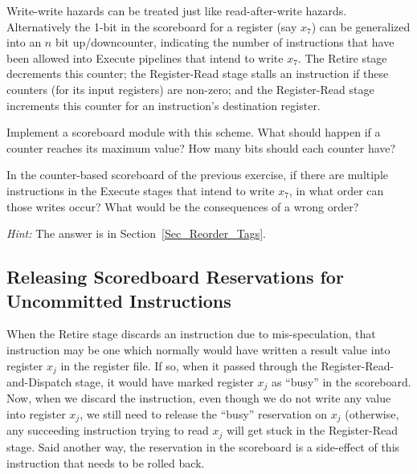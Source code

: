 \Exercise

Write-write hazards can be treated just like read-after-write hazards.
Alternatively the 1-bit in the scoreboard for a register (say $x_7$)
can be generalized into an $n$ bit up/downcounter, indicating the
number of instructions that have been allowed into Execute pipelines
that intend to write $x_7$.  The Retire stage decrements this counter;
the Register-Read stage stalls an instruction if these counters (for
its input registers) are non-zero; and the Register-Read stage
increments this counter for an instruction's destination register.

\vspace{1ex}

Implement a scoreboard module with this scheme.  What should happen if
a counter reaches its maximum value?  How many bits should each
counter have?

\vspace{1ex}

\Exercise

In the counter-based scoreboard of the previous exercise, if there are
multiple instructions in the Execute stages that intend to write
$x_7$, in what order can those writes occur?  What would be the
consequences of a wrong order?

\emph{Hint:} The answer is in Section~\ref{Sec_Reorder_Tags}.

\Endexercise


\subsection{Releasing Scoredboard Reservations for Uncommitted Instructions}

When the Retire stage discards an instruction due to mis-speculation,
that instruction may be one which normally would have written a result
value into register $x_j$ in the register file.  If so, when it passed
through the Register-Read-and-Dispatch stage, it would have marked
register $x_j$ as ``busy'' in the scoreboard.  Now, when we discard
the instruction, even though we do not write any value into register
$x_j$, we still need to release the ``busy'' reservation on $x_j$
(otherwise, any succeeding instruction trying to read $x_j$ will get
stuck in the Register-Read stage.  Said another way, the reservation
in the scoreboard is a side-effect of this instruction that needs to
be rolled back.

